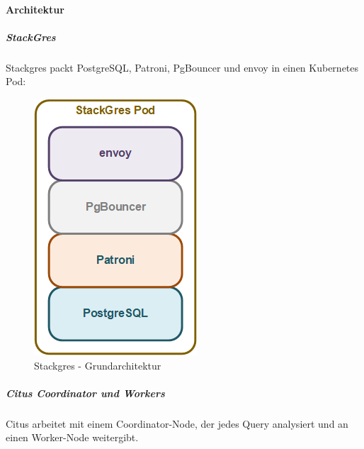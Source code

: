 \begin{flushleft}
    \paragraph{Architektur}
    \begin{flushleft}
        \subparagraph{StackGres}
        Stackgres packt PostgreSQL, Patroni, PgBouncer und envoy in einen Kubernetes Pod:
        \begin{figure}[H]
            \centering
            \includegraphics[width=0.75\linewidth]{source/implementation/evaluation/postgresql_ha_solutions/stackgres/stackgres_pod_architecture}
            \caption{Stackgres - Grundarchitektur}
            \label{fig:stackgres_pod_architecture}
        \end{figure}
    \end{flushleft}
    \begin{flushleft}
        \subparagraph{Citus Coordinator und Workers}
        Citus arbeitet mit einem Coordinator-Node, der jedes Query analysiert und an einen Worker-Node weitergibt.
        \begin{figure}[H]

\end{figure}
\end{flushleft}
\end{flushleft}
